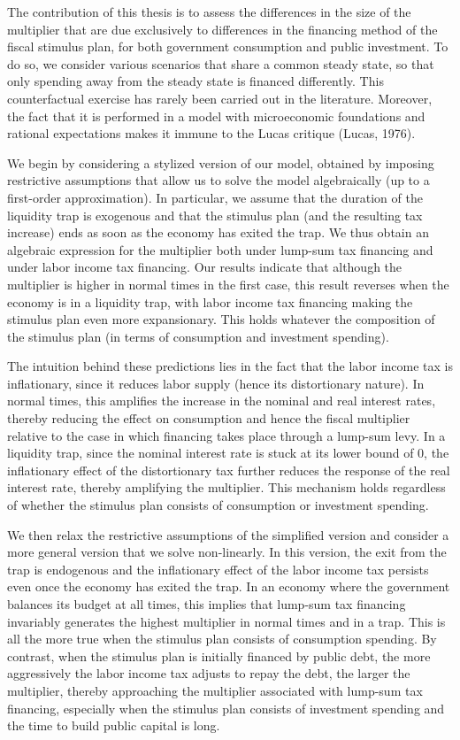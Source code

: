 \documentclass[12pt,letterpaper]{article}
\begin{document}
The contribution of this thesis is to assess the differences in the size of the multiplier that are due exclusively to differences in the financing method of the fiscal stimulus plan, for both government consumption and public investment. To do so, we consider various scenarios that share a common steady state, so that only spending away from the steady state is financed differently. This counterfactual exercise has rarely been carried out in the literature. Moreover, the fact that it is performed in a model with microeconomic foundations and rational expectations makes it immune to the Lucas critique (Lucas, 1976).

We begin by considering a stylized version of our model, obtained by imposing restrictive assumptions that allow us to solve the model algebraically (up to a first-order approximation). In particular, we assume that the duration of the liquidity trap is exogenous and that the stimulus plan (and the resulting tax increase) ends as soon as the economy has exited the trap. We thus obtain an algebraic expression for the multiplier both under lump-sum tax financing and under labor income tax financing. Our results indicate that although the multiplier is higher in normal times in the first case, this result reverses when the economy is in a liquidity trap, with labor income tax financing making the stimulus plan even more expansionary. This holds whatever the composition of the stimulus plan (in terms of consumption and investment spending).

The intuition behind these predictions lies in the fact that the labor income tax is inflationary, since it reduces labor supply (hence its distortionary nature). In normal times, this amplifies the increase in the nominal and real interest rates, thereby reducing the effect on consumption and hence the fiscal multiplier relative to the case in which financing takes place through a lump-sum levy. In a liquidity trap, since the nominal interest rate is stuck at its lower bound of 0, the inflationary effect of the distortionary tax further reduces the response of the real interest rate, thereby amplifying the multiplier. This mechanism holds regardless of whether the stimulus plan consists of consumption or investment spending.

We then relax the restrictive assumptions of the simplified version and consider a more general version that we solve non-linearly. In this version, the exit from the trap is endogenous and the inflationary effect of the labor income tax persists even once the economy has exited the trap. In an economy where the government balances its budget at all times, this implies that lump-sum tax financing invariably generates the highest multiplier in normal times and in a trap. This is all the more true when the stimulus plan consists of consumption spending. By contrast, when the stimulus plan is initially financed by public debt, the more aggressively the labor income tax adjusts to repay the debt, the larger the multiplier, thereby approaching the multiplier associated with lump-sum tax financing, especially when the stimulus plan consists of investment spending and the time to build public capital is long.
\end{document}
